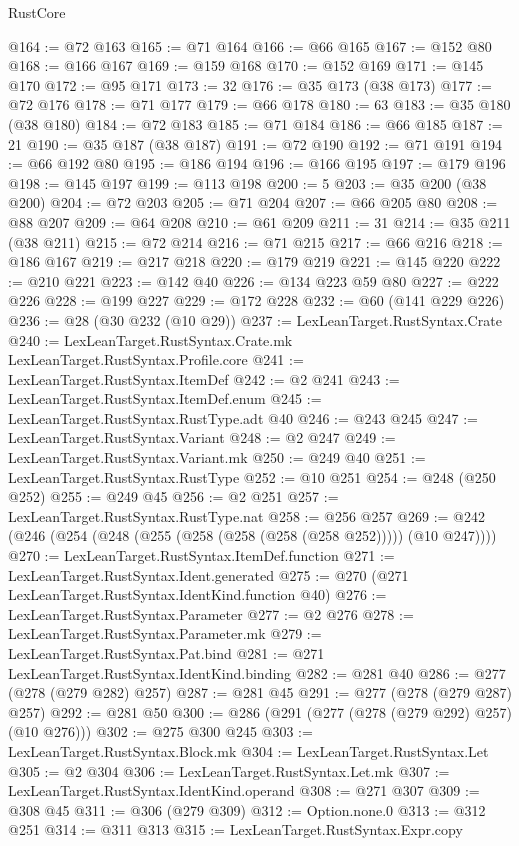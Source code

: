 \begin{lexlean}{RustCore}
\begin{coremodule}
@164 := @72 @163
@165 := @71 @164
@166 := @66 @165
@167 := @152 @80
@168 := @166 @167
@169 := @159 @168
@170 := @152 @169
@171 := @145 @170
@172 := @95 @171
@173 := 32
@176 := @35 @173 (@38 @173)
@177 := @72 @176
@178 := @71 @177
@179 := @66 @178
@180 := 63
@183 := @35 @180 (@38 @180)
@184 := @72 @183
@185 := @71 @184
@186 := @66 @185
@187 := 21
@190 := @35 @187 (@38 @187)
@191 := @72 @190
@192 := @71 @191
@194 := @66 @192 @80
@195 := @186 @194
@196 := @166 @195
@197 := @179 @196
@198 := @145 @197
@199 := @113 @198
@200 := 5
@203 := @35 @200 (@38 @200)
@204 := @72 @203
@205 := @71 @204
@207 := @66 @205 @80
@208 := @88 @207
@209 := @64 @208
@210 := @61 @209
@211 := 31
@214 := @35 @211 (@38 @211)
@215 := @72 @214
@216 := @71 @215
@217 := @66 @216
@218 := @186 @167
@219 := @217 @218
@220 := @179 @219
@221 := @145 @220
@222 := @210 @221
@223 := @142 @40
@226 := @134 @223 @59 @80
@227 := @222 @226
@228 := @199 @227
@229 := @172 @228
@232 := @60 (@141 @229 @226)
@236 := @28 (@30 @232 (@10 @29))
@237 := LexLeanTarget.RustSyntax.Crate
@240 := LexLeanTarget.RustSyntax.Crate.mk LexLeanTarget.RustSyntax.Profile.core
@241 := LexLeanTarget.RustSyntax.ItemDef
@242 := @2 @241
@243 := LexLeanTarget.RustSyntax.ItemDef.enum
@245 := LexLeanTarget.RustSyntax.RustType.adt @40
@246 := @243 @245
@247 := LexLeanTarget.RustSyntax.Variant
@248 := @2 @247
@249 := LexLeanTarget.RustSyntax.Variant.mk
@250 := @249 @40
@251 := LexLeanTarget.RustSyntax.RustType
@252 := @10 @251
@254 := @248 (@250 @252)
@255 := @249 @45
@256 := @2 @251
@257 := LexLeanTarget.RustSyntax.RustType.nat
@258 := @256 @257
@269 := @242 (@246 (@254 (@248 (@255 (@258 (@258 (@258 (@258 @252))))) (@10 @247))))
@270 := LexLeanTarget.RustSyntax.ItemDef.function
@271 := LexLeanTarget.RustSyntax.Ident.generated
@275 := @270 (@271 LexLeanTarget.RustSyntax.IdentKind.function @40)
@276 := LexLeanTarget.RustSyntax.Parameter
@277 := @2 @276
@278 := LexLeanTarget.RustSyntax.Parameter.mk
@279 := LexLeanTarget.RustSyntax.Pat.bind
@281 := @271 LexLeanTarget.RustSyntax.IdentKind.binding
@282 := @281 @40
@286 := @277 (@278 (@279 @282) @257)
@287 := @281 @45
@291 := @277 (@278 (@279 @287) @257)
@292 := @281 @50
@300 := @286 (@291 (@277 (@278 (@279 @292) @257) (@10 @276)))
@302 := @275 @300 @245
@303 := LexLeanTarget.RustSyntax.Block.mk
@304 := LexLeanTarget.RustSyntax.Let
@305 := @2 @304
@306 := LexLeanTarget.RustSyntax.Let.mk
@307 := LexLeanTarget.RustSyntax.IdentKind.operand
@308 := @271 @307
@309 := @308 @45
@311 := @306 (@279 @309)
@312 := Option.none.{0}
@313 := @312 @251
@314 := @311 @313
@315 := LexLeanTarget.RustSyntax.Expr.copy

\end{coremodule}
\end{lexlean}
